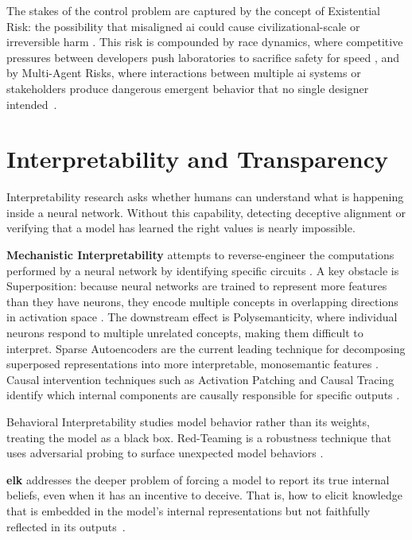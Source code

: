 	The stakes of the control problem are captured by the concept of Existential Risk: the possibility that misaligned \gls{ai} could cause civilizational-scale or irreversible harm \cite{yampolskiy_controllability_2022}. This risk is compounded by race dynamics, where competitive pressures between developers push laboratories to sacrifice safety for speed \cite{hemphill_advanced_2025}, and by Multi-Agent Risks, where interactions between multiple \gls{ai} systems or stakeholders produce dangerous emergent behavior that no single designer intended~\cite{hammond2025multiagent, metr-2026-openai-hugging-face-incident-investigation}.

	\section{Interpretability and Transparency}\label{sec:interpretability}

	Interpretability research asks whether humans can understand what is happening inside a neural network. Without this capability, detecting deceptive alignment or verifying that a model has learned the right values is nearly impossible.

	\textbf{Mechanistic Interpretability} attempts to reverse-engineer the computations performed by a neural network by identifying specific circuits \cite{anthropic2025biology}. A key obstacle is Superposition: because neural networks are trained to represent more features than they have neurons, they encode multiple concepts in overlapping directions in activation space \cite{anthropic2025biology}. The downstream effect is Polysemanticity, where individual neurons respond to multiple unrelated concepts, making them difficult to interpret. Sparse Autoencoders are the current leading technique for decomposing superposed representations into more interpretable, monosemantic features \cite{bricken2023towards}. Causal intervention techniques such as Activation Patching and Causal Tracing identify which internal components are causally responsible for specific outputs \cite{meng2022locating}.

	Behavioral Interpretability studies model behavior rather than its weights, treating the model as a black box. Red-Teaming is a robustness technique that uses adversarial probing to surface unexpected model behaviors \cite{perez2022redteaming}.

	\textbf{\gls{elk}} addresses the deeper problem of forcing a model to report its true internal beliefs, even when it has an incentive to deceive. That is, how to elicit knowledge that is embedded in the model's internal representations but not faithfully reflected in its outputs~\cite{arc2021elk}.

